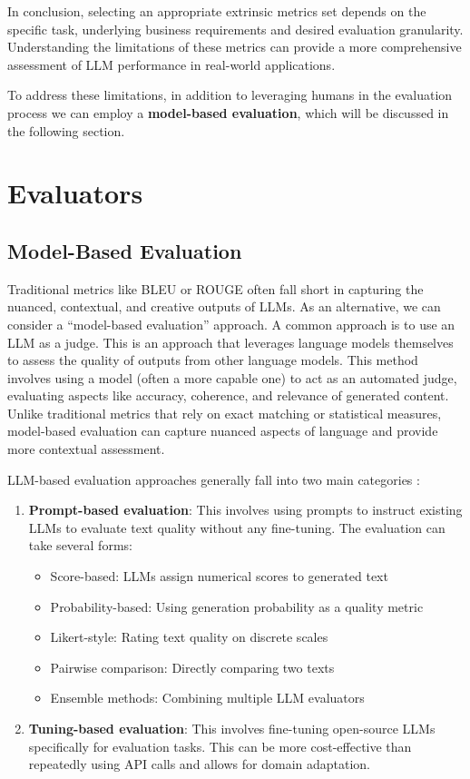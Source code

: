 In conclusion, selecting an appropriate extrinsic metrics set depends on the specific task, underlying business requirements and desired evaluation granularity. Understanding the limitations of these metrics can provide a more comprehensive assessment of LLM performance in real-world applications.

To address these limitations, in addition to leveraging humans in the evaluation process we can employ a \textbf{model-based evaluation}, which will be discussed in the following section.
\section{Evaluators}

\subsection{Model-Based Evaluation}
\label{sec:model-based-eval}
Traditional metrics like BLEU or ROUGE often fall short in capturing the nuanced, contextual, and creative outputs of LLMs. As an alternative, we can consider a ``model-based evaluation'' approach. A common approach is to use an LLM as a judge. This is an approach that leverages language models themselves to assess the quality of outputs from other language models. This method involves using a model (often a more capable one) to act as an automated judge, evaluating aspects like accuracy, coherence, and relevance of generated content. Unlike traditional metrics that rely on exact matching or statistical measures, model-based evaluation can capture nuanced aspects of language and provide more contextual assessment.

LLM-based evaluation approaches generally fall into two main categories :

\begin{enumerate}
    \item \textbf{Prompt-based evaluation}: This involves using prompts to instruct existing LLMs to evaluate text quality without any fine-tuning. The evaluation can take several forms:
    \begin{itemize}
        \item Score-based: LLMs assign numerical scores to generated text
        \item Probability-based: Using generation probability as a quality metric
        \item Likert-style: Rating text quality on discrete scales
        \item Pairwise comparison: Directly comparing two texts
        \item Ensemble methods: Combining multiple LLM evaluators
    \end{itemize}
    \item \textbf{Tuning-based evaluation}: This involves fine-tuning open-source LLMs specifically for evaluation tasks. This can be more cost-effective than repeatedly using API calls and allows for domain adaptation.
\end{enumerate}

